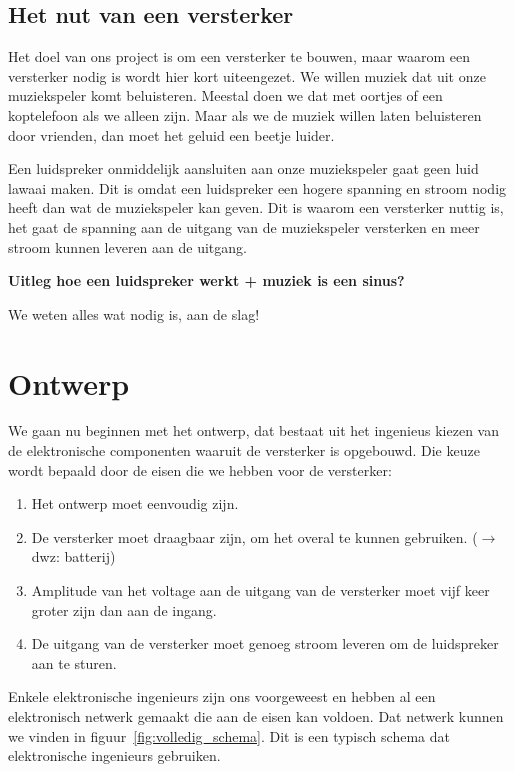 \documentclass{article}
\begin{document}
\subsection{}


\subsection{Het nut van een versterker}

Het doel van ons project is om een versterker te bouwen, maar waarom een versterker nodig is wordt hier kort uiteengezet. We willen muziek dat uit onze muziekspeler komt beluisteren. Meestal doen we dat met oortjes of een koptelefoon als we alleen zijn. Maar als we de muziek willen laten beluisteren door vrienden, dan moet het geluid een beetje luider.

Een luidspreker onmiddelijk aansluiten aan onze muziekspeler gaat geen luid lawaai maken. Dit is omdat een luidspreker een hogere spanning en stroom nodig heeft dan wat de muziekspeler kan geven. Dit is waarom een versterker nuttig is, het gaat de spanning aan de uitgang van de muziekspeler versterken en meer stroom kunnen leveren aan de uitgang.

\textbf{Uitleg hoe een luidspreker werkt + muziek is een sinus?}

We weten alles wat nodig is, aan de slag!

\section{Ontwerp}

We gaan nu beginnen met het ontwerp, dat bestaat uit het ingenieus kiezen van de elektronische componenten waaruit de versterker is opgebouwd. Die keuze wordt bepaald door de eisen die we hebben voor de versterker:

\begin{enumerate}
	\item Het ontwerp moet eenvoudig zijn.
	\item De versterker moet draagbaar zijn, om het overal te kunnen gebruiken. ($\rightarrow$ dwz: batterij)
	\item Amplitude van het voltage aan de uitgang van de versterker moet vijf keer groter zijn dan aan de ingang.
	\item De uitgang van de versterker moet genoeg stroom leveren om de luidspreker aan te sturen.
\end{enumerate}

Enkele elektronische ingenieurs zijn ons voorgeweest en hebben al een elektronisch netwerk gemaakt die aan de eisen kan voldoen. Dat netwerk kunnen we vinden in figuur~\ref{fig:volledig_schema}. Dit is een typisch schema dat elektronische ingenieurs gebruiken. 
\end{document}
